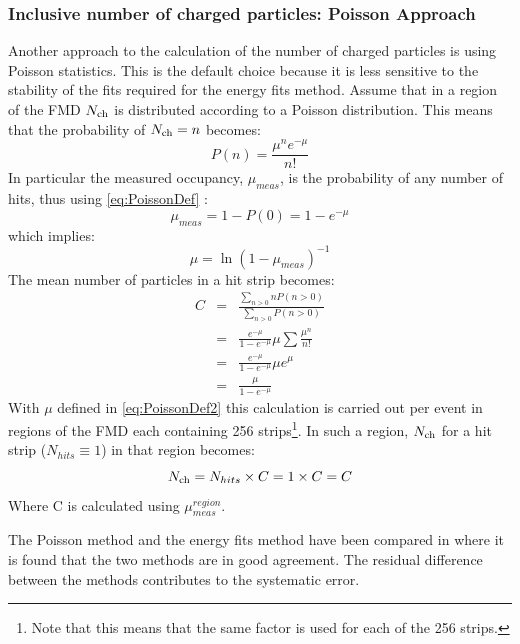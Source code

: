 \documentclass[11pt]{article}
\newcommand{\mult}[1][]{\ensuremath N_{\text{ch}#1}}
\begin{document}
\subsubsection{Inclusive number of charged particles: Poisson Approach} 
\label{sec:sub:sub:poisson}
Another approach to the calculation of the number of charged particles
is using Poisson statistics. This is the default choice because it is
less sensitive to the stability of the fits required for the energy
fits method. 
Assume that in a region of the FMD %
$\mult$ 
is
distributed according to a Poisson distribution. This means that the
probability of $\mult=n$ becomes:
\begin{equation}
P(n) = \frac{\mu^n e^{-\mu}}{n!} \label{eq:PoissonDef}
\end{equation}
In particular the measured occupancy, $\mu_{meas}$, is the probability
of any number of hits, thus using \eqref{eq:PoissonDef} :
\begin{equation}
\mu_{meas} = 1 - P(0) = 1 - e^{-\mu } 
\end{equation}
which implies:
\begin{equation}
\mu = \ln
(1 - \mu_{meas})^{-1} \label{eq:PoissonDef2}
\end{equation}
The mean number of particles in a hit strip becomes:
\begin{eqnarray}
C &=& \frac{\sum_{n>0} n P(n>0)}{\sum_{n>0} P(n>0)} \nonumber \\
  &=& \frac{e^{-\mu}}{1-e^{-\mu}} \mu  \sum \frac{\mu^n}{n!} 
  \nonumber \\
  &=& \frac{e^{-\mu}}{1-e^{-\mu}} \mu e^{\mu} \nonumber \\
  &=& \frac{\mu}{1-e^{-\mu}}
\end{eqnarray}
With $\mu$ defined in \eqref{eq:PoissonDef2} this calculation is
carried out per event in
regions of the FMD each containing 256 strips\footnote{Note that this means that the same factor is used for each of the 256 strips.}. %
 In such a region,
$\mult$ for a hit strip ($N_{hits} \equiv 1$) in that region becomes:
\begin{equation}
\mult = N_{hits} \times C = 1 \times C = C
\end{equation}
Where C is calculated using $\mu_{meas}^{region}$.

The Poisson method and the energy fits method have been compared in
\cite{hhd:2009} where it is found that the two methods are in good
agreement. The residual difference between the methods contributes to
the systematic error.
\end{document}

